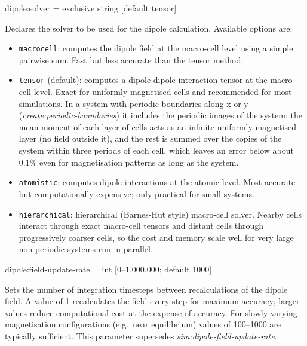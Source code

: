{\zicf dipole:solver = exclusive string [default tensor]}
Declares the solver to be used for the dipole calculation. Available options are:
\begin{itemize}
  \item[] \texttt{macrocell}: computes the dipole field at the macro-cell level using a simple pairwise sum. Fast but less accurate than the tensor method.
  \item[] \texttt{tensor} (default): computes a dipole-dipole interaction tensor at the macro-cell level. Exact for uniformly magnetised cells and recommended for most simulations. In a system with periodic boundaries along x or y (\textit{create:periodic-boundaries}) it includes the periodic images of the system: the mean moment of each layer of cells acts as an infinite uniformly magnetised layer (no field outside it), and the rest is summed over the copies of the system within three periods of each cell, which leaves an error below about 0.1\% even for magnetisation patterns as long as the system.
  \item[] \texttt{atomistic}: computes dipole interactions at the atomic level. Most accurate but computationally expensive; only practical for small systems.
  \item[] \texttt{hierarchical}: hierarchical (Barnes-Hut style) macro-cell solver. Nearby cells interact through exact macro-cell tensors and distant cells through progressively coarser cells, so the cost and memory scale well for very large non-periodic systems run in parallel.
\end{itemize}

{\zicf dipole:field-update-rate = int [0--1,000,000; default 1000]} Sets the number of integration timesteps between recalculations of the dipole field. A value of 1 recalculates the field every step for maximum accuracy; larger values reduce computational cost at the expense of accuracy. For slowly varying magnetisation configurations (e.g.\ near equilibrium) values of 100--1000 are typically sufficient. This parameter supersedes \textit{sim:dipole-field-update-rate}.

